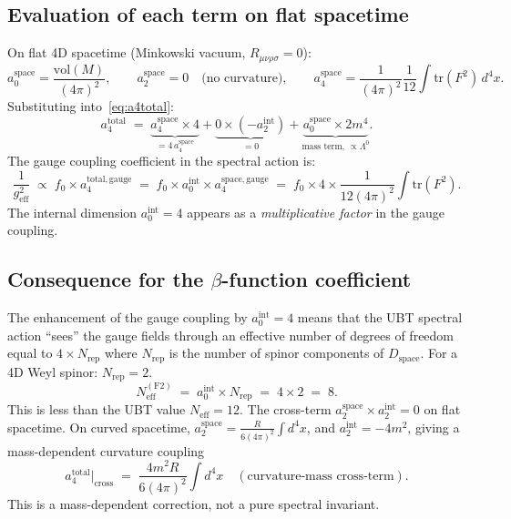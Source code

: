 \documentclass[11pt,a4paper]{article}
\theoremstyle{definition}
\theoremstyle{remark}
\begin{document}
\subsection{Evaluation of each term on flat spacetime}

On flat 4D spacetime (Minkowski vacuum, $R_{\mu\nu\rho\sigma} = 0$):
\begin{equation}
  a_0^{\mathrm{space}} = \frac{\mathrm{vol}(M)}{(4\pi)^2},
  \qquad
  a_2^{\mathrm{space}} = 0 \quad\text{(no curvature)},
  \qquad
  a_4^{\mathrm{space}} = \frac{1}{(4\pi)^2}\frac{1}{12}\int\mathrm{tr}(F^2)\,d^4x.
  \label{eq:aspace_flat}
\end{equation}
Substituting into~\eqref{eq:a4total}:
\begin{equation}
  a_4^{\mathrm{total}} \;=\;
  \underbrace{a_4^{\mathrm{space}} \times 4}_{= 4\,a_4^{\mathrm{space}}}
  + \underbrace{0 \times (-a_2^{\mathrm{int}})}_{= 0}
  + \underbrace{a_0^{\mathrm{space}} \times 2m^4}_{\text{mass term, $\propto \Lambda^0$}}.
  \label{eq:a4total_flat}
\end{equation}
The gauge coupling coefficient in the spectral action is:
\begin{equation}
  \frac{1}{g^2_{\mathrm{eff}}} \;\propto\; f_0 \times a_4^{\mathrm{total, gauge}}
  \;=\; f_0 \times a_0^{\mathrm{int}} \times a_4^{\mathrm{space, gauge}}
  \;=\; f_0 \times 4 \times \frac{1}{12(4\pi)^2}\int\mathrm{tr}(F^2).
  \label{eq:geff_F2}
\end{equation}
The internal dimension $a_0^{\mathrm{int}} = 4$ appears as a
\emph{multiplicative factor} in the gauge coupling.

\subsection{Consequence for the $\beta$-function coefficient}

The enhancement of the gauge coupling by $a_0^{\mathrm{int}} = 4$ means
that the UBT spectral action ``sees'' the gauge fields through an effective
number of degrees of freedom equal to $4 \times N_{\mathrm{rep}}$ where
$N_{\mathrm{rep}}$ is the number of spinor components of $D_{\mathrm{space}}$.
For a 4D Weyl spinor: $N_{\mathrm{rep}} = 2$.
\begin{equation}
  N_{\mathrm{eff}}^{(\mathrm{F2})} \;=\; a_0^{\mathrm{int}} \times N_{\mathrm{rep}}
  \;=\; 4 \times 2 \;=\; 8.
  \label{eq:Neff_F2}
\end{equation}
This is less than the UBT value $N_{\mathrm{eff}} = 12$.
The cross-term $a_2^{\mathrm{space}} \times a_2^{\mathrm{int}} = 0$ on flat
spacetime.
On curved spacetime, $a_2^{\mathrm{space}} = \frac{R}{6(4\pi)^2}\int d^4x$, and
$a_2^{\mathrm{int}} = -4m^2$, giving a mass-dependent curvature coupling
\begin{equation}
  a_4^{\mathrm{total}}\big|_{\mathrm{cross}}
  \;=\; \frac{4m^2 R}{6(4\pi)^2}\int d^4x
  \quad(\text{curvature-mass cross-term}).
  \label{eq:cross_term}
\end{equation}
This is a mass-dependent correction, not a pure spectral invariant.
\end{document}
